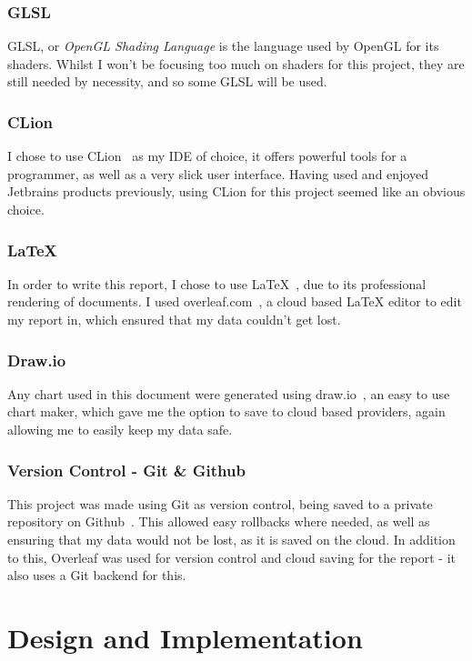 \documentclass[a4paper,10pt]{report}
\begin{document}
\subsection{GLSL}

GLSL, or \textit{OpenGL Shading Language} is the language used by OpenGL for its shaders. Whilst I won't be focusing too much on shaders for this project, they are still needed by necessity, and so some GLSL will be used.

\subsection{CLion}
I chose to use CLion~\cite{clion_jetbrains} as my IDE of choice, it offers powerful tools for a programmer, as well as a very slick user interface. Having used and enjoyed Jetbrains products previously, using CLion for this project seemed like an obvious choice.

\subsection{LaTeX}
In order to write this report, I chose to use LaTeX~\cite{latex_website}, due to its professional rendering of documents. I used overleaf.com~\cite{overleaf_website}, a cloud based LaTeX editor to edit my report in, which ensured that my data couldn't get lost.

\subsection{Draw.io}
Any chart used in this document were generated using draw.io~\cite{draw_io}, an easy to use chart maker, which gave me the option to save to cloud based providers, again allowing me to easily keep my data safe. 

\subsection{Version Control - Git \& Github}
This project was made using Git as version control, being saved to a private repository on Github~\cite{github}. This allowed easy rollbacks where needed, as well as ensuring that my data would not be lost, as it is saved on the cloud. In addition to this, Overleaf was used for version control and cloud saving for the report - it also uses a Git backend for this.


\chapter{Design and Implementation}
\end{document}
